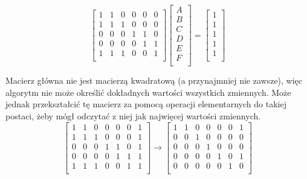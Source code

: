 \documentclass[letterpaper,12pt]{article}
\begin{document}
\[
\begin{bmatrix}
    1 & 1 & 0 & 0 & 0 & 0 \\
    1 & 1 & 1 & 0 & 0 & 0 \\
    0 & 0 & 0 & 1 & 1 & 0 \\
    0 & 0 & 0 & 0 & 1 & 1 \\
    1 & 1 & 1 & 0 & 0 & 1 \\
\end{bmatrix}
\begin{bmatrix}
    A \\ B \\ C \\ D \\ E \\ F\\
\end{bmatrix}
=
\begin{bmatrix}
    1 \\ 1 \\ 1 \\ 1 \\ 1 \\
\end{bmatrix}
\]

Macierz główna nie jest macierzą kwadratową (a przynajmniej nie zawsze), 
więc algorytm nie może określić dokładnych wartości wszystkich zmiennych. Może jednak 
przekształcić tę macierz za pomocą operacji elementarnych do takiej postaci, żeby
mógł odczytać z niej jak najwięcej wartości zmiennych. 
\[
\left[
\begin{array}{cccccc|c}
    1 & 1 & 0 & 0 & 0 & 0 & 1\\
    1 & 1 & 1 & 0 & 0 & 0 & 1\\
    0 & 0 & 0 & 1 & 1 & 0 & 1 \\
    0 & 0 & 0 & 0 & 1 & 1 & 1\\
    1 & 1 & 1 & 0 & 0 & 1 & 1\\
\end{array}
\right]
\longrightarrow
\left[
\begin{array}{cccccc|c}
    1 & 1 & 0 & 0 & 0 & 0 & 1\\
    0 & 0 & 1 & 0 & 0 & 0 & 0\\
    0 & 0 & 0 & 1 & 0 & 0 & 0 \\
    0 & 0 & 0 & 0 & 1 & 0 & 1\\
    0 & 0 & 0 & 0 & 0 & 1 & 0\\
\end{array}
\right]
\] \\
\end{document}
